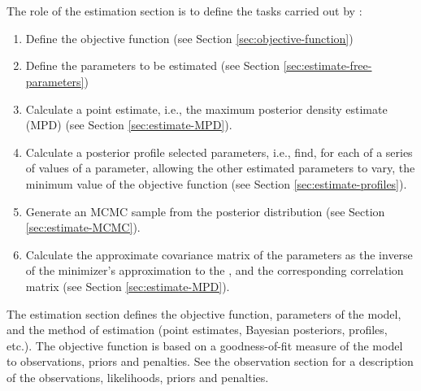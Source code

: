 \section{\label{sec:estimation-section}}

\subsection{\label{sec:role-of-the-estimation-section}}
The role of the estimation section is to define the tasks carried out by \CNAME: 

\begin{enumerate}
  \item Define the objective function (see Section \ref{sec:objective-function})
  \item Define the parameters to be estimated (see Section \ref{sec:estimate-free-parameters})
  \item Calculate a point estimate, i.e., the maximum posterior density estimate (MPD) (see Section \ref{sec:estimate-MPD}).
  \item Calculate a posterior profile selected parameters, i.e., find, for each of a series of values of a parameter, allowing the other estimated parameters to vary, the minimum value of the objective function (see Section \ref{sec:estimate-profiles}).
  \item Generate an MCMC sample from the posterior distribution (see Section \ref{sec:estimate-MCMC}).
  \item Calculate the approximate covariance matrix of the parameters as the inverse of the minimizer\textquoteright{}s approximation to the , and the corresponding correlation matrix (see Section \ref{sec:estimate-MPD}).
\end{enumerate}

The estimation section defines the objective function, parameters of the model, and the method of estimation (point estimates, Bayesian posteriors, profiles, etc.). The objective function is based on a goodness-of-fit measure of the model to observations, priors and penalties. See the observation section for a description of the observations, likelihoods, priors and penalties. 

\subsection{\label{sec:objective-function}}

